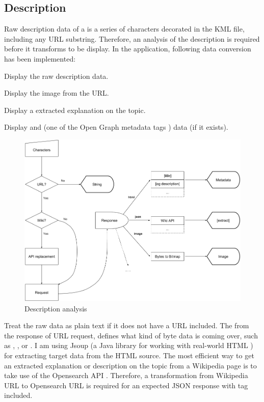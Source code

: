 \subsection{Description}

Raw description data of a  is a series of characters decorated in the KML file, including any URL substring. Therefore, an analysis of the description is required before it transforms to be display. In the application, following data conversion has been implemented:

\begin{description}
\setlength{\parskip}{0pt}
\item[$\bullet$ Plain text] Display the raw description data.
\item[$\bullet$ Image] Display the image from the URL.
\item[$\bullet$ Wikipedia] Display a extracted explanation on the topic.
\item[$\bullet$ HTML] Display  and  (one of the Open Graph metadata tags \cite{ogp.2014}) data (if it exists).
\end{description}

\begin{figure}[H]
\caption{Description analysis}
\label{fig:description-analysis}
\centering
\includegraphics[width=\textwidth, keepaspectratio]{Figures/description-analysis.png}
\decoRule
\end{figure}

Treat the raw data as plain text if it does not have a URL included. The\; from the response of URL request, defines what kind of byte data is coming over, such as , , or . I am using Jsoup (a Java library for working with real-world HTML \cite{joup.2016}) for extracting target data from the HTML source. The most efficient way to get an extracted explanation or description on the topic from a Wikipedia page is to take use of the Opensearch API \cite{wiki.api.2016}. Therefore, a transformation from Wikipedia URL to Opensearch URL is required for an expected JSON response with  tag included.

